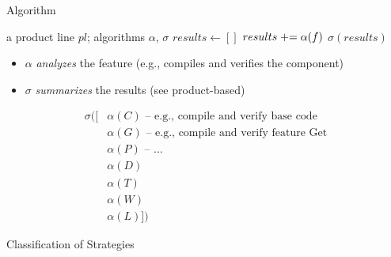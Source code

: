 \begin{frame}{\myframetitle}
	\begin{fancycolumns}
		\begin{definition}{Algorithm}
			\begin{algorithmic}
				\Require a product line $pl$; algorithms $\alpha$, $\sigma$
				\State $results \gets []$
				 
				\State $results \mathrel{+}= \alpha(f)$ 
				\EndFor
				\State \Return $\sigma(results)$
			\end{algorithmic}
		\end{definition}
		\begin{note}{}
			\begin{itemize}
				\item $\alpha$ \emph{analyzes} the feature (e.g., compiles and verifies the component)
				\item $\sigma$ \emph{summarizes} the results (see product-based)
			\end{itemize}
		\end{note}
	\nextcolumn
		\begin{exampletight}{}
			\begin{center}
				\small\featureDiagramConfigurableDatabase
			\end{center}
		\end{exampletight}
		\begin{example}{}
			\vspace*{-1.5ex}
			\small
			\begin{align*}
				\sigma([&\alpha(C) \text{ -- e.g., compile and verify base code}\\
				&\alpha(G) \text{ -- e.g., compile and verify feature Get}\\
				&\alpha(P) \text{ -- \ldots}\\
				&\alpha(D)\\
				&\alpha(T)\\
				&\alpha(W)\\
				&\alpha(L)])
			\end{align*}
		\end{example}
	\end{fancycolumns}
\end{frame}

\begin{frame}{Classification of Strategies}
	\begin{fancycolumns}[t,columns=3,animation=none]
		\summaryproductbased
	\nextcolumn
		\summaryfeaturebased
	\nextcolumn
	\end{fancycolumns}
\end{frame}


